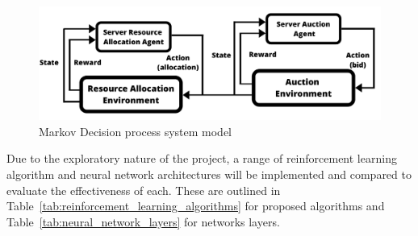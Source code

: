 \begin{figure}[H]
    \centering
    \includegraphics[width=14cm]{figures/3_solution_figs/flexible_resource_allocation_env.pdf}
    \caption{Markov Decision process system model}
    \label{fig:mdp_system_model}
\end{figure}

Due to the exploratory nature of the project, a range of reinforcement learning algorithm and neural network
architectures will be implemented and compared to evaluate the effectiveness of each. These are outlined in
Table~\ref{tab:reinforcement_learning_algorithms} for proposed algorithms and Table~\ref{tab:neural_network_layers} for
networks layers. \\

